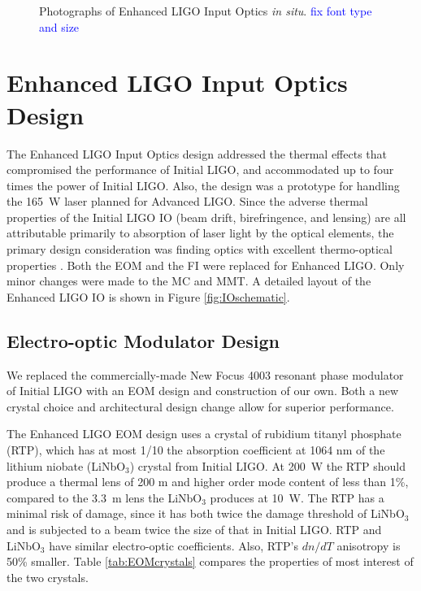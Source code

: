 \begin{figure}
\begin{centering}
\caption[Photographs of Enhanced LIGO Input
Optics \emph{in situ}]{Photographs of Enhanced LIGO Input Optics
  \emph{in situ}. \textcolor{blue}{fix font type and size}}
\label{fig:IOpictures}
\end{centering}
\end{figure}



\section{Enhanced LIGO Input Optics Design}
\label{sec:design}
The Enhanced LIGO Input Optics design addressed the thermal effects
that compromised the performance of Initial LIGO, and accommodated up
to four times the power of Initial LIGO. Also, the design was a
prototype for handling the 165~W laser planned for Advanced
LIGO. Since the adverse thermal properties of the Initial LIGO IO
(beam drift, birefringence, and lensing) are all attributable
primarily to absorption of laser light by the optical elements, the
primary design consideration was finding optics with excellent
thermo-optical properties \citep{UFLIGOGroup2006Upgrading}. Both the
EOM and the FI were replaced for Enhanced LIGO. Only minor changes
were made to the MC and MMT. A detailed layout of the Enhanced LIGO IO
is shown in Figure \ref{fig:IOschematic}.


\subsection{Electro-optic Modulator Design}
We replaced the commercially-made New Focus 4003 resonant phase
modulator of Initial LIGO with an EOM design and construction of our
own. Both a new crystal choice and architectural design change allow
for superior performance.

The Enhanced LIGO EOM design uses a crystal of rubidium titanyl
phosphate (RTP), which has at most 1/10 the absorption coefficient at
1064 nm of the lithium niobate (LiNbO$_3$) crystal from Initial
LIGO. At 200~W the RTP should produce a thermal lens of 200 m and
higher order mode content of less than 1\%, compared to the 3.3~m lens
the LiNbO$_3$ produces at 10~W. The RTP has a minimal risk of damage,
since it has both twice the damage threshold of LiNbO$_3$ and is
subjected to a beam twice the size of that in Initial LIGO. RTP and
LiNbO$_3$ have similar electro-optic coefficients. Also, RTP's $dn/dT$
anisotropy is 50\% smaller. Table \ref{tab:EOMcrystals} compares the
properties of most interest of the two crystals.

